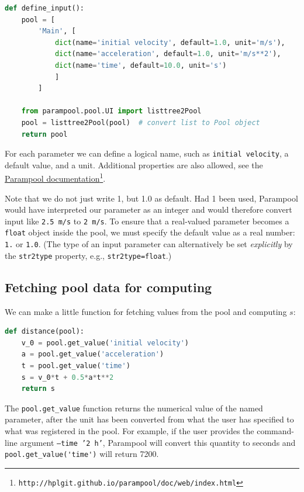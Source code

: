 \documentclass[graybox,envcountchap,sectrefs,final]{svmonodo}
\newenvironment{notice_mdfboxadmon}[1][]{
\begin{notice_mdfboxmdframed}[frametitle=#1]
}
{
\end{notice_mdfboxmdframed}
}
\begin{document}
\begin{lstlisting}[language=Python,style=graycolor]
def define_input():
    pool = [
        'Main', [
            dict(name='initial velocity', default=1.0, unit='m/s'),
            dict(name='acceleration', default=1.0, unit='m/s**2'),
            dict(name='time', default=10.0, unit='s')
            ]
        ]

    from parampool.pool.UI import listtree2Pool
    pool = listtree2Pool(pool)  # convert list to Pool object
    return pool
\end{lstlisting}
For each parameter we can define a logical name, such as \texttt{initial velocity},
a default value, and a unit. Additional properties
are also allowed, see the \href{{http://hplgit.github.io/parampool/doc/web/index.html}}{Parampool documentation}\footnote{\texttt{http://hplgit.github.io/parampool/doc/web/index.html}}.


\begin{notice_mdfboxadmon}
Note that we do not just write 1, but 1.0 as default.
Had 1 been used, Parampool would have interpreted our parameter as
an integer and would therefore convert input like \texttt{2.5 m/s} to \texttt{2 m/s}.
To ensure that a real-valued parameter becomes a \texttt{float} object inside
the pool, we must specify the default value as a real number: \texttt{1.} or \texttt{1.0}.
(The type of an input parameter can alternatively be set \emph{explicitly} by
the \texttt{str2type} property, e.g., \texttt{str2type=float}.)
\end{notice_mdfboxadmon}



\subsection{Fetching pool data for computing}

We can make a little function for fetching values from the pool
and computing $s$:

\begin{lstlisting}[language=Python,style=graycolor]
def distance(pool):
    v_0 = pool.get_value('initial velocity')
    a = pool.get_value('acceleration')
    t = pool.get_value('time')
    s = v_0*t + 0.5*a*t**2
    return s
\end{lstlisting}
The \Verb!pool.get_value! function returns the numerical value of
the named parameter, after the unit has been converted from what the
user has specified to what was registered in the pool.
For example, if the user provides the command-line argument
\texttt{--time '2 h'}, Parampool will convert this quantity to seconds and
\Verb!pool.get_value('time')! will return 7200.
\end{document}
